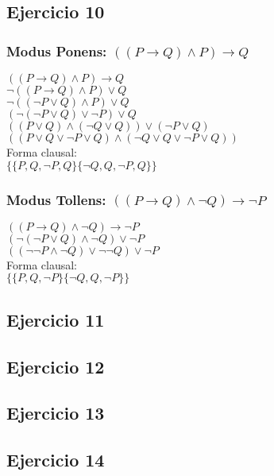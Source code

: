 \documentclass[10pt,a4paper]{article}
\begin{document}
  \subsection{Ejercicio 10}
\subsubsection{Modus Ponens: $((P \rightarrow Q) \wedge P) \rightarrow Q$}
$((P \rightarrow Q) \wedge P) \rightarrow Q$ \\
$\neg ((P \rightarrow Q) \wedge P) \vee Q$ \\
$\neg ((\neg P \vee Q) \wedge P) \vee Q$ \\
$(\neg (\neg P \vee Q) \vee \neg P) \vee Q$ \\
$((P \vee Q) \wedge (\neg Q \vee Q )) \vee (\neg P \vee Q)$ \\
$((P \vee Q \vee \neg P \vee Q) \wedge (\neg Q \vee Q \vee \neg P \vee Q))$ \\
Forma clausal: \\
$\{\{P, Q, \neg P, Q\}\{\neg Q, Q, \neg P, Q\}\}$ \\

\subsubsection{Modus Tollens: $((P \rightarrow Q) \wedge \neg Q) \rightarrow \neg P$}
$((P \rightarrow Q) \wedge \neg Q) \rightarrow \neg P$ \\
$(\neg (\neg P \vee Q) \wedge \neg Q) \vee \neg P$ \\
$((\neg \neg P \wedge \neg Q) \vee \neg \neg Q) \vee \neg P$ \\
Forma clausal: \\
$\{\{P, Q, \neg P\}\{\neg Q , Q, \neg P\}\} $ \\

  \subsection{Ejercicio 11}
  \subsection{Ejercicio 12}
  \subsection{Ejercicio 13}
  \subsection{Ejercicio 14}
\end{document}
